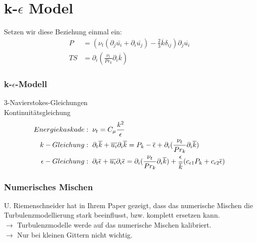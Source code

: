 \documentclass[11pt,t]{beamer}
\newcommand*\mean[1]{\overline{#1}}
\begin{document}
\section{k-$\epsilon$ Model}

\begin{frame}
Setzen wir diese Beziehung einmal ein:
\vspace{1cm}
\begin{align*}
P &= (\nu_t(\partial_j \bar{u_i} + \partial_i \bar{u_j})-\frac{2}{3}\mean{k}\delta_{ij})\partial_j\mean{u_i}\\
TS &= \partial_i(\frac{\nu_t}{Pr_k} \partial_i \mean{k})
\end{align*}
\end{frame}

\begin{frame}
\frametitle{k-$\epsilon$-Modell}
3-Navierstokes-Gleichungen\\
Kontinuitätsgleichung\\
\begin{align*}
Energiekaskade:& \hspace{0.2cm}\nu_t = C_\mu \frac{k^2}{\epsilon}\\
k-Gleichung:& \hspace{0.2cm}\partial_t \mean{k}+ \mean{u_i}\partial_i \mean{k} = P_k - \mean{\epsilon} + \partial_i(\frac{\nu_t}{Pr_k} \partial_i \mean{k})\\
\epsilon-Gleichung:&
\hspace{0.2cm}\partial_t \mean{\epsilon}+ \mean{u_i}\partial_i \mean{\epsilon} = \partial_i(\frac{\nu_t}{Pr_k} \partial_i \mean{k}) + \frac{\epsilon}{\mean{k}}(c_{\epsilon 1}P_{k}+c_{\epsilon 2}\mean{\epsilon})
\end{align*}
\end{frame}
\begin{frame}
\frametitle{Numerisches Mischen}
U. Riemenschneider hat in Ihrem Paper gezeigt, dass das numerische Mischen die Turbulenzmodellierung stark beeinflusst, bzw. komplett ersetzen kann.\\
\vspace{1cm}
$\rightarrow$ Turbulenzmodelle werde auf das numerische Mischen kalibriert.\\
$\rightarrow$ Nur bei kleinen Gittern nicht wichtig. 
\end{frame}
\end{document}
